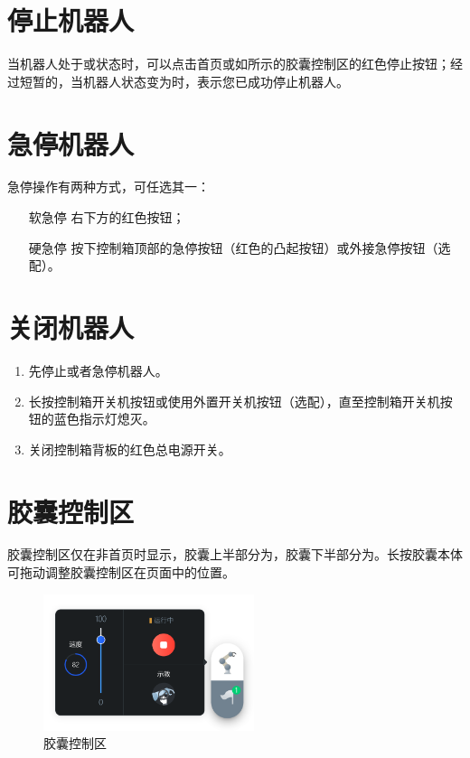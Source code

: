 \section{停止机器人}
当机器人处于或状态时，可以点击首页或如所示的胶囊控制区的红色停止按钮；经过短暂的，当机器人状态变为时，表示您已成功停止机器人。


\section{急停机器人}

急停操作有两种方式，可任选其一：
\begin{itemize}[leftmargin=3.5em]
	\item[软急停] \LM 右下方的红色按钮；
	\item[硬急停] 按下控制箱顶部的急停按钮（红色的凸起按钮）或外接急停按钮（选配）。
\end{itemize}


\section{关闭机器人}
\begin{enumerate}
	\item 先停止或者急停机器人。
	\item 长按控制箱开关机按钮或使用外置开关机按钮（选配），直至控制箱开关机按钮的蓝色指示灯熄灭。
	\item 关闭控制箱背板的红色总电源开关。
\end{enumerate}


\section{胶囊控制区}
胶囊控制区仅在非首页时显示，胶囊上半部分为，胶囊下半部分为。长按胶囊本体可拖动调整胶囊控制区在页面中的位置。

\begin{figure}[hb]
	\centering
	\includegraphics[height=4cm]{screen/2-18.png}
	\caption{胶囊控制区}
	\label{fig:胶囊控制区}
\end{figure}

